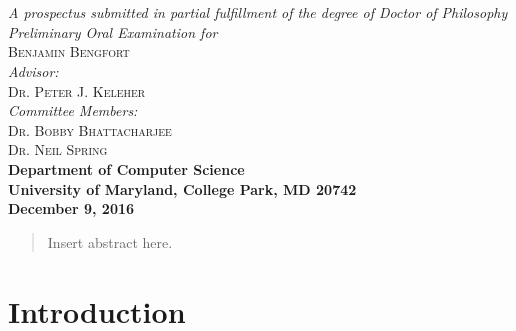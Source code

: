 \documentclass{article}
\begin{document}
\begin{titlepage}
\begin{center}

\textsc{\huge \bfseries {}}\\
\textsc{\huge \bfseries {}}\\[1.0cm]

\emph{A prospectus submitted in partial fulfillment of the degree of Doctor of
Philosophy}\\[5.5cm]


\emph{Preliminary Oral Examination for}\\
\textsc{\large Benjamin Bengfort}\\[2.0cm] %
\emph{Advisor:} \\
\textsc{Dr. Peter J. Keleher}\\[.5cm]
\emph{Committee Members:}\\
\textsc{Dr. Bobby Bhattacharjee}\\
\textsc{Dr. Neil Spring}\\[4.0cm]

{\bfseries Department of Computer Science}\\
{\bfseries University of Maryland, College Park, MD 20742}\\
{\bfseries December 9, 2016}
\vfill

\end{center}
\end{titlepage}

\newpage
\thispagestyle{empty}
\mbox{}


\newpage
\setcounter{page}{1}
\doublespacing
\begin{abstract}

Insert abstract here.

\end{abstract}

\newpage
\tableofcontents

\newpage
\listoffigures

\newpage
\doublespacing


\section{Introduction}

\end{document}
